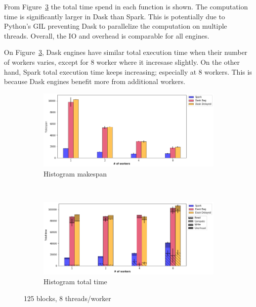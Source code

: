 \documentclass[conference]{IEEEtran}
\begin{document}
From Figure~\ref{fig:histo_tt_worker} the total time spend in each function is shown.
The computation time is significantly larger in Dask than Spark. This is potentially
due to Python's GIL preventing Dask to parallelize the computation on multiple threads.
Overall, the IO and overhead is comparable for all engines.

On Figure~\ref{fig:histo_tt_worker}, Dask engines have similar total execution time
when their number of workers varies, except for 8 worker where it incresase slightly.
On the other hand, Spark total execution time keeps increasing; especially at 8
workers. This is because Dask engines benefit more from additional workers.

\begin{figure}[!t]
    \centering
    \begin{subfigure}[b]{\columnwidth}
        \includegraphics[clip,width=\columnwidth]{images/histo_worker.png}%
        \caption{Histogram makespan}\label{fig:histo_ms_worker}
    \end{subfigure}
    \\
    \begin{subfigure}[b]{\columnwidth}
        \includegraphics[clip,width=\columnwidth]{images/histo_idle_worker.png}%
        \caption{Histogram total time}\label{fig:histo_tt_worker}
    \end{subfigure}
    \caption{125 blocks, 8 threads/worker}
\end{figure}
\end{document}
